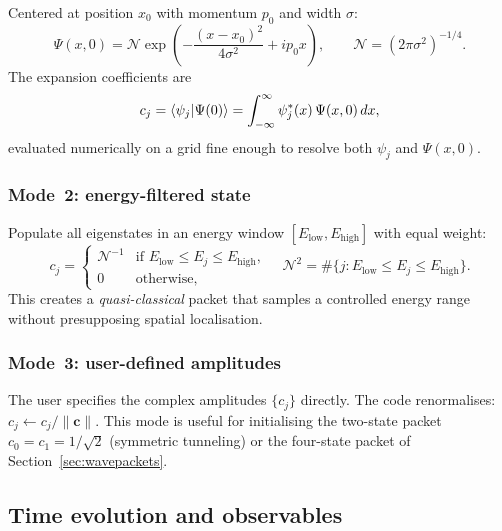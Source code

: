 Centered at position $x_0$ with momentum $p_0$ and width $\sigma$:
\begin{equation}\label{eq:wp_gauss}
  \Psi(x,0) = \mathcal{N}\exp\!\left(-\frac{(x-x_0)^2}{4\sigma^2}
              + i p_0 x\right), \qquad
  \mathcal{N} = (2\pi\sigma^2)^{-1/4}.
\end{equation}
The expansion coefficients are
\begin{equation}\label{eq:cj_gauss}
  c_j = \braket{\psi_j}{\Psi(0)}
      = \int_{-\infty}^{\infty} \psi_j^*(x)\,\Psi(x,0)\,dx,
\end{equation}
evaluated numerically on a grid fine enough to resolve both $\psi_j$ and
$\Psi(x,0)$.

\subsubsection{Mode~2: energy-filtered state}\label{sec:wp_energy}

Populate all eigenstates in an energy window
$[E_{\mathrm{low}},E_{\mathrm{high}}]$ with equal weight:
\begin{equation}\label{eq:wp_energy}
  c_j =
  \begin{cases}
    \mathcal{N}^{-1} & \text{if } E_{\mathrm{low}} \leq E_j \leq E_{\mathrm{high}},\\
    0 & \text{otherwise,}
  \end{cases}
  \quad
  \mathcal{N}^{2} = \#\{j : E_{\mathrm{low}}\leq E_j\leq E_{\mathrm{high}}\}.
\end{equation}
This creates a \emph{quasi-classical} packet that samples a controlled energy
range without presupposing spatial localisation.

\subsubsection{Mode~3: user-defined amplitudes}\label{sec:wp_user}

The user specifies the complex amplitudes $\{c_j\}$ directly.  The code
renormalises: $c_j \leftarrow c_j/\|\mathbf{c}\|$.  This mode is useful for
initialising the two-state packet $c_0=c_1=1/\sqrt{2}$ (symmetric
tunneling) or the four-state packet of Section~\ref{sec:wavepackets}.

\subsection{Time evolution and observables}\label{sec:gen_time_evo}

